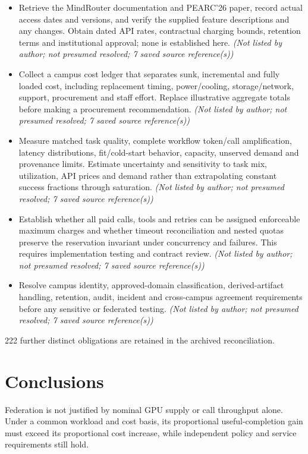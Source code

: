 \documentclass[11pt]{article}
\begin{document}
\begin{itemize}
\item Retrieve the MindRouter documentation and PEARC'26 paper, record actual access dates and versions, and verify the supplied feature descriptions and any changes. Obtain dated API rates, contractual charging bounds, retention terms and institutional approval; none is established here. \textit{ (Not listed by author; not presumed resolved; 7 saved source reference(s))}
\item Collect a campus cost ledger that separates sunk, incremental and fully loaded cost, including replacement timing, power/cooling, storage/network, support, procurement and staff effort. Replace illustrative aggregate totals before making a procurement recommendation. \textit{ (Not listed by author; not presumed resolved; 7 saved source reference(s))}
\item Measure matched task quality, complete workflow token/call amplification, latency distributions, fit/cold-start behavior, capacity, unserved demand and provenance limits. Estimate uncertainty and sensitivity to task mix, utilization, API prices and demand rather than extrapolating constant success fractions through saturation. \textit{ (Not listed by author; not presumed resolved; 7 saved source reference(s))}
\item Establish whether all paid calls, tools and retries can be assigned enforceable maximum charges and whether timeout reconciliation and nested quotas preserve the reservation invariant under concurrency and failures. This requires implementation testing and contract review. \textit{ (Not listed by author; not presumed resolved; 7 saved source reference(s))}
\item Resolve campus identity, approved-domain classification, derived-artifact handling, retention, audit, incident and cross-campus agreement requirements before any sensitive or federated testing. \textit{ (Not listed by author; not presumed resolved; 7 saved source reference(s))}
\end{itemize}
222 further distinct obligations are retained in the archived reconciliation.
\section{Conclusions}
Federation is not justified by nominal GPU supply or call throughput alone. Under a common workload and cost basis, its proportional useful-completion gain must exceed its proportional cost increase, while independent policy and service requirements still hold.
\end{document}
